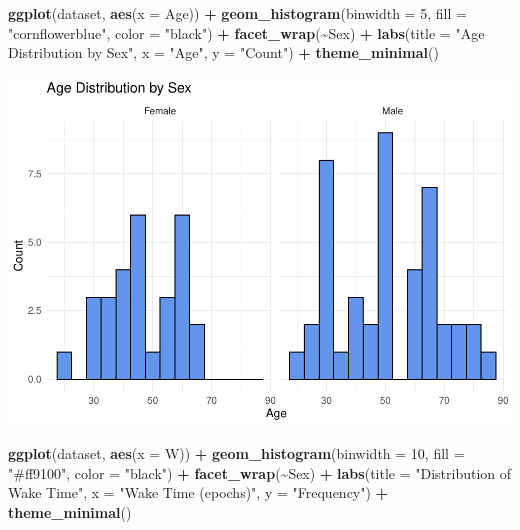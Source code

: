 \documentclass[
]{article}
\newenvironment{Shaded}{\begin{snugshade}}{\end{snugshade}}
\newcommand{\AttributeTok}[1]{\textcolor[rgb]{0.13,0.29,0.53}{#1}}
\newcommand{\DecValTok}[1]{\textcolor[rgb]{0.00,0.00,0.81}{#1}}
\newcommand{\FunctionTok}[1]{\textcolor[rgb]{0.13,0.29,0.53}{\textbf{#1}}}
\newcommand{\NormalTok}[1]{#1}
\newcommand{\SpecialCharTok}[1]{\textcolor[rgb]{0.81,0.36,0.00}{\textbf{#1}}}
\newcommand{\StringTok}[1]{\textcolor[rgb]{0.31,0.60,0.02}{#1}}
\begin{document}
\begin{Shaded}
\begin{Highlighting}[]
\FunctionTok{ggplot}\NormalTok{(dataset, }\FunctionTok{aes}\NormalTok{(}\AttributeTok{x =}\NormalTok{ Age)) }\SpecialCharTok{+} 
  \FunctionTok{geom\_histogram}\NormalTok{(}\AttributeTok{binwidth =} \DecValTok{5}\NormalTok{, }\AttributeTok{fill =} \StringTok{"cornflowerblue"}\NormalTok{, }\AttributeTok{color =} \StringTok{"black"}\NormalTok{) }\SpecialCharTok{+} 
  \FunctionTok{facet\_wrap}\NormalTok{(}\SpecialCharTok{\textasciitilde{}}\NormalTok{Sex) }\SpecialCharTok{+} 
  \FunctionTok{labs}\NormalTok{(}\AttributeTok{title =} \StringTok{"Age Distribution by Sex"}\NormalTok{, }\AttributeTok{x =} \StringTok{"Age"}\NormalTok{, }\AttributeTok{y =} \StringTok{"Count"}\NormalTok{) }\SpecialCharTok{+}
  \FunctionTok{theme\_minimal}\NormalTok{()}
\end{Highlighting}
\end{Shaded}

\includegraphics{602_project_files/figure-latex/unnamed-chunk-15-1.pdf}

\begin{Shaded}
\begin{Highlighting}[]
\FunctionTok{ggplot}\NormalTok{(dataset, }\FunctionTok{aes}\NormalTok{(}\AttributeTok{x =}\NormalTok{ W)) }\SpecialCharTok{+} 
  \FunctionTok{geom\_histogram}\NormalTok{(}\AttributeTok{binwidth =} \DecValTok{10}\NormalTok{, }\AttributeTok{fill =} \StringTok{"\#ff9100"}\NormalTok{, }\AttributeTok{color =} \StringTok{"black"}\NormalTok{) }\SpecialCharTok{+} \FunctionTok{facet\_wrap}\NormalTok{(}\SpecialCharTok{\textasciitilde{}}\NormalTok{Sex) }\SpecialCharTok{+} 
  \FunctionTok{labs}\NormalTok{(}\AttributeTok{title =} \StringTok{"Distribution of Wake Time"}\NormalTok{, }\AttributeTok{x =} \StringTok{"Wake Time (epochs)"}\NormalTok{, }\AttributeTok{y =} \StringTok{"Frequency"}\NormalTok{) }\SpecialCharTok{+} 
  \FunctionTok{theme\_minimal}\NormalTok{()}
\end{Highlighting}
\end{Shaded}
\end{document}
